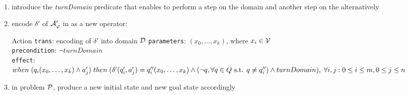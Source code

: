 \documentclass[10pt]{beamer}
\newcounter{saveenumi}
\newcommand{\conti}{\setcounter{enumi}{\value{saveenumi}}}
\begin{document}
\begin{frame}{}
%


\begin{enumerate}
\conti
\item introduce the \textit{turnDomain} predicate that enables to perform a step on the domain and another step on the \DFA alternatively
\item encode $\delta'$ of $\automaton'_\varphi$ in \PDDL as a new operator:
\begin{block}{\normalsize Action \texttt{trans}: encoding of $\delta'$ into domain $\D$}
\texttt{parameters}: $(x_0, \dots, x_k)$, where $x_i \in \V$\\
\texttt{precondition}: $\lnot turnDomain$\\
\texttt{effect}: $when\; (q_i(x_0, \dots, x_k) \lAND a'_j)\; then\; (\delta'(q'_i, a'_j)=q''_i(x_0, \dots, x_k) \lAND (\lnot q, \forall q \in Q \text{ s.t. } q \neq q''_i) \lAND turnDomain),\; \forall i,j: 0\leq i \leq m, 0\leq j \leq n$
\end{block}
\item in problem $\P$, produce a new initial state and new goal state accordingly


\end{enumerate}
\end{frame}
\end{document}
